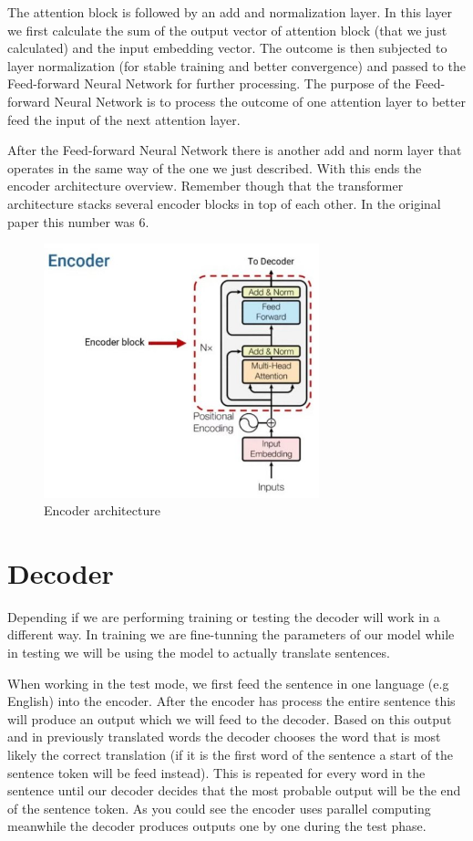 \noindent The attention block is followed by an add and normalization layer. In this layer we first calculate the sum of the output vector of attention block (that we just calculated) and the input embedding vector. The outcome is then subjected to layer normalization (for stable training and better convergence) and passed to the Feed-forward Neural Network for further processing. The purpose of the Feed-forward Neural Network is to process the outcome of one attention layer to better feed the input of the next attention layer.

\newpage
\noindent After the Feed-forward Neural Network there is another add and norm layer that operates in the same way of the one we just described. With this ends the encoder architecture overview. Remember though that the transformer architecture stacks several encoder blocks in top of each other. In the original paper this number was 6.

\begin{figure}[h]
    \centering
    \includegraphics[width=8cm]{Images/encoder.jpg}
    \caption{Encoder architecture}
\end{figure}


\section{Decoder}

Depending if we are performing training or testing the decoder will work in a different way. In training we are fine-tunning the parameters of our model while in testing we will be using the model to actually translate sentences.

\noindent When working in the test mode, we first feed the sentence in one language (e.g English) into the encoder. After the encoder has process the entire sentence this will produce an output which we will feed to the decoder. Based on this output and in previously translated words the decoder chooses the word that is most likely the correct translation (if it is the first word of the sentence a start of the sentence token will be feed instead). This is repeated for every word in the sentence until our decoder decides that the most probable output will be the end of the sentence token. As you could see the encoder uses parallel computing meanwhile the decoder produces outputs one by one during the test phase.

